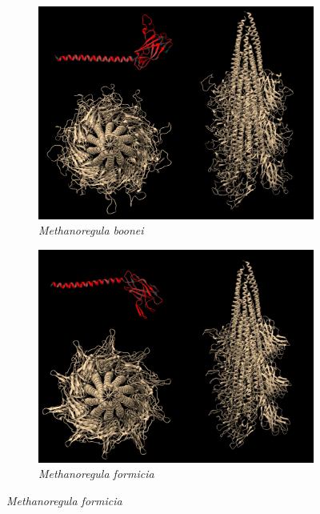\documentclass[fontsize=12pt,headsepline=true, bibliography=totocnumbered, twoside]{scrbook} %
\begin{document}
\begin{figure}
\begin{subfigure}{.5\textwidth}
  \centering
  \includegraphics[width=0.9\linewidth]{boonei}  
  \caption{\textit{Methanoregula boonei}}
  
\end{subfigure}
\begin{subfigure}{.5\textwidth}
  \centering
  \includegraphics[width=.9\linewidth]{formicia}  
  \caption{\textit{Methanoregula formicia}}
  
\end{subfigure}

\vspace{0.3cm}


\end{figure}
\end{document}

